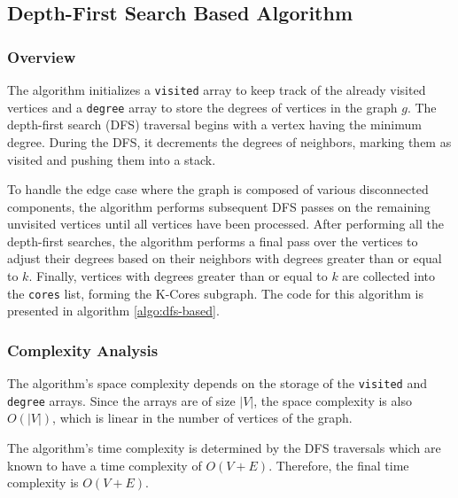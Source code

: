 \subsection{Depth-First Search Based Algorithm}

\subsubsection{Overview}

The algorithm initializes a \texttt{visited} array to keep track of the already visited vertices and a \texttt{degree} array to store the degrees of vertices in the graph \(g\). The depth-first search (DFS) traversal begins with a vertex having the minimum degree. During the DFS, it decrements the degrees of neighbors, marking them as visited and pushing them into a stack. 

To handle the edge case where the graph is composed of various disconnected components, the algorithm performs subsequent DFS passes on the remaining unvisited vertices until all vertices have been processed. After performing all the depth-first searches, the algorithm performs a final pass over the vertices to adjust their degrees based on their neighbors with degrees greater than or equal to \(k\). Finally, vertices with degrees greater than or equal to \(k\) are collected into the \texttt{cores} list, forming the K-Cores subgraph. The code for this algorithm is presented in algorithm \ref{algo:dfs-based}.



\subsubsection{Complexity Analysis}

The algorithm's space complexity depends on the storage of the \texttt{visited} and \texttt{degree} arrays. Since the arrays are of size \(|V|\), the space complexity is also \(O(|V|)\), which is linear in the number of vertices of the graph.

The algorithm's time complexity is determined by the DFS traversals which are known to have a time complexity of \(O(V + E)\). Therefore, the final time complexity is \(O(V + E)\).
    
    
